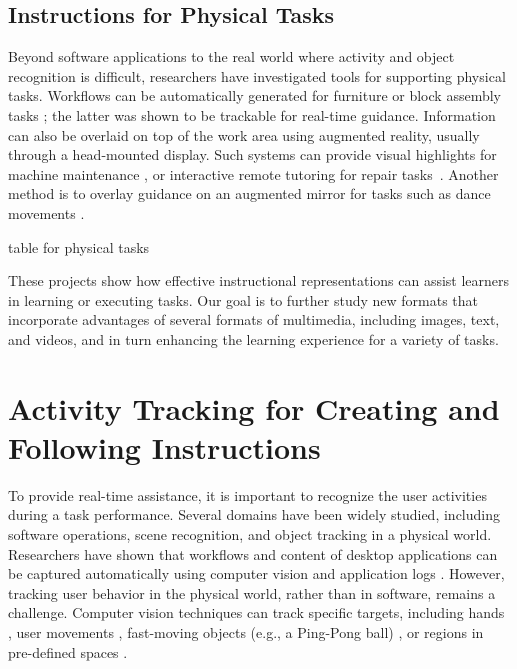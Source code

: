 \subsection{Instructions for Physical Tasks}

Beyond software applications to the real world where activity and object recognition is difficult, researchers have investigated tools for supporting physical tasks. Workflows can be automatically generated for furniture \cite{agrawala2003designing} or block assembly tasks \cite{Gupta:2012ku}; the latter was shown to be trackable for real-time guidance.
%
Information can also be overlaid on top of the work area using augmented reality, usually through a head-mounted display. Such systems can provide visual highlights for machine maintenance \cite{Henderson:2011ff}, or interactive remote tutoring for repair tasks~\cite{Gurevich:2012ko}. Another method is to overlay guidance on an augmented mirror for tasks such as dance movements \cite{Anderson:2013:YEM:2501988.2502045}.

table for physical tasks \cite{Knibbe:2015:SMI:2817721.2817741}

These projects show how effective instructional representations can assist learners in learning or executing tasks. Our goal is to further study new formats that incorporate advantages of several formats of multimedia, including images, text, and videos, and in turn enhancing the learning experience for a variety of tasks.



\section{Activity Tracking for Creating and Following Instructions}
\label{background_recognition}

To provide real-time assistance, it is important to recognize the user activities during a task performance. Several domains have been widely studied, including software operations, scene recognition, and object tracking in a physical world.
%
Researchers have shown that workflows and content of desktop applications can be captured automatically using computer vision \cite{Yeh:2009dh,Chang:2011vd} and application logs \cite{Grossman:2010jz,Grabler:2009jj,Pongnumkul:2011ju}.
%
However, tracking user behavior in the physical world, rather than in software, remains a challenge. Computer vision techniques can track specific targets, including hands \cite{Ranjan:2008}, user movements \cite{Wilson:2012fb}, fast-moving objects (e.g., a Ping-Pong ball) \cite{Okumura:2011tr}, or regions in pre-defined spaces \cite{Ranjan:2007}.


